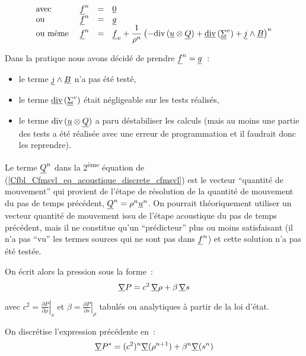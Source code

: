 \begin{equation}\label{Cfbl_Cfmsvl_eq_forces_supplementaires_cfmsvl}
\begin{array}{llll}
\text{avec\ }&\underline{f}^n &=& \underline{0} \\
\text{ou\ }&\underline{f}^n &=& \underline{g} \\
\text{ou même\ }&\underline{f}^n &=& \underline{f}_v
 + \displaystyle\frac{1}{\rho^n}
\left( - \text{div}\,(\underline{u} \otimes \underline{Q}) + \underline{\text{div}}\,(\underline{\underline{\Sigma}}^v)
 + \underline{j}\wedge\underline{B} \right)^n
\end{array}
\end{equation}

Dans la pratique nous avons décidé de prendre $\underline{f}^n=\underline{g}$~:
\begin{itemize}
  \item le terme $\underline{j}\wedge\underline{B}$ n'a pas été testé,
  \item le terme $\underline{\text{div}}\,(\underline{\underline{\Sigma}}^v)$ était négligeable sur les tests
        réalisés,
  \item le terme $\text{div}\,(\underline{u} \otimes \underline{Q})$ a paru déstabiliser les
        calculs (mais au moins une partie des tests a été réalisée
        avec une erreur de programmation et il faudrait donc les reprendre).
\end{itemize}
\bigskip

Le terme $\underline{Q}^n$ dans la 2\textsuperscript{ème} équation
de (\ref{Cfbl_Cfmsvl_eq_acoustique_discrete_cfmsvl}) est le vecteur ``quantité de mouvement''
qui provient de l'étape de résolution de la quantité de mouvement du pas
de temps précédent, $\underline{Q}^n = \rho^n \underline{u}^n$.
On pourrait théoriquement utiliser un vecteur quantité de mouvement issu
de l'étape acoustique du pas de temps précédent, mais il ne constitue
qu'un ``prédicteur'' plus ou moins satisfaisant (il n'a pas ``vu'' les termes
sources qui ne sont pas dans  $\underline{f}^n$) et cette solution
n'a pas été testée.

\bigskip
On écrit alors la pression sous la forme~:
\begin{equation}
\underline{\nabla}{P}=c^2\,\underline{\nabla}{\rho}+\beta\,\underline{\nabla}{s}
\end{equation}

avec $c^2 = \left.\displaystyle\frac{\partial P}{\partial \rho}\right|_s$
et $\beta = \left.\displaystyle\frac{\partial P}{\partial s}\right|_\rho$
tabulés ou analytiques à partir de la loi d'état.

On discrétise l'expression précédente en~:
\begin{equation}
\underline{\nabla}{P^*}=(c^2)^n\underline{\nabla}(\rho^{n+1})+\beta^n\underline{\nabla}(s^n)
\end{equation}

